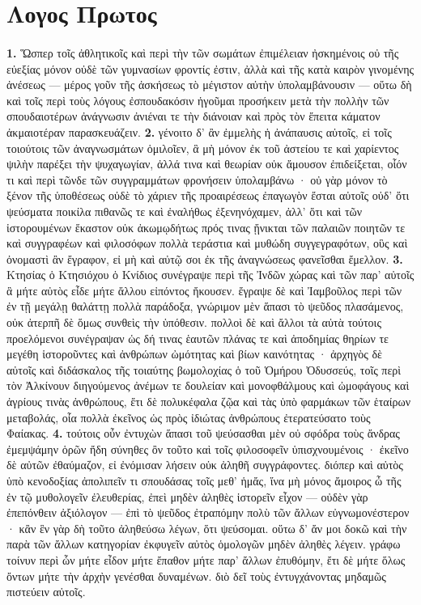 \documentclass[a4paper, 11pt, oneside, polutonikogreek, german]{article}
\begin{document}
\section{Λογος Πρωτος}
\paragraph{}
\textbf{1.} Ὥσπερ τοῖς ἀθλητικοῖς καὶ περὶ τὴν τῶν σωμάτων ἐπιμέλειαν ἠσκημένοις οὐ τῆς εὐεξίας μόνον οὐδὲ τῶν γυμνασίων φροντίς ἐστιν, ἀλλὰ καὶ τῆς κατὰ καιρὸν γινομένης ἀνέσεως --- μέρος γοῦν τῆς ἀσκήσεως τὸ μέγιστον αὐτὴν ὑπολαμβάνουσιν --- οὕτω δὴ καὶ τοῖς περὶ τοὺς λόγους ἐσπουδακόσιν ἡγοῦμαι προσήκειν μετὰ τὴν πολλὴν τῶν σπουδαιοτέρων ἀνάγνωσιν ἀνιέναι τε τὴν διάνοιαν καὶ πρὸς τὸν ἔπειτα κάματον ἀκμαιοτέραν παρασκευάζειν. \textbf{2.} γένοιτο δ' ἂν ἐμμελὴς ἡ ἀνάπαυσις αὐτοῖς, εἰ τοῖς τοιούτοις τῶν ἀναγνωσμάτων ὁμιλοῖεν, ἃ μὴ μόνον ἐκ τοῦ ἀστείου τε καὶ χαρίεντος ψιλὴν παρέξει τὴν ψυχαγωγίαν, ἀλλά τινα καὶ θεωρίαν οὐκ ἄμουσον ἐπιδείξεται, οἷόν τι καὶ περὶ τῶνδε τῶν συγγραμμάτων φρονήσειν ὑπολαμβάνω · οὐ γὰρ μόνον τὸ ξένον τῆς ὑποθέσεως οὐδὲ τὸ χάριεν τῆς προαιρέσεως ἐπαγωγὸν ἔσται αὐτοῖς οὐδ' ὅτι ψεύσματα ποικίλα πιθανῶς τε καὶ ἐναλήθως ἐξενηνόχαμεν, ἀλλ' ὅτι καὶ τῶν ἱστορουμένων ἕκαστον οὐκ ἀκωμῳδήτως πρός τινας ᾔνικται τῶν παλαιῶν ποιητῶν τε καὶ συγγραφέων καὶ φιλοσόφων πολλὰ τεράστια καὶ μυθώδη συγγεγραφότων, οὓς καὶ ὀνομαστὶ ἂν ἔγραφον, εἰ μὴ καὶ αὐτῷ σοι ἐκ τῆς ἀναγνώσεως φανεῖσθαι ἔμελλον. \textbf{3.} Κτησίας ὁ Κτησιόχου ὁ Κνίδιος συνέγραψε περὶ τῆς Ἰνδῶν χώρας καὶ τῶν παρ' αὐτοῖς ἃ μήτε αὐτὸς εἶδε μήτε ἄλλου εἰπόντος ἤκουσεν. ἔγραψε δὲ καὶ Ἰαμβοῦλος περὶ τῶν ἐν τῇ μεγάλῃ θαλάττῃ πολλὰ παράδοξα, γνώριμον μὲν ἅπασι τὸ ψεῦδος πλασάμενος, οὐκ ἀτερπῆ δὲ ὅμως συνθεὶς τὴν ὑπόθεσιν. πολλοὶ δὲ καὶ ἄλλοι τὰ αὐτὰ τούτοις προελόμενοι συνέγραψαν ὡς δή τινας ἑαυτῶν πλάνας τε καὶ ἀποδημίας θηρίων τε μεγέθη ἱστοροῦντες καὶ ἀνθρώπων ὠμότητας καὶ βίων καινότητας · ἀρχηγὸς δὲ αὐτοῖς καὶ διδάσκαλος τῆς τοιαύτης βωμολοχίας ὁ τοῦ Ὁμήρου Ὀδυσσεύς, τοῖς περὶ τὸν Ἀλκίνουν διηγούμενος ἀνέμων τε δουλείαν καὶ μονοφθάλμους καὶ ὠμοφάγους καὶ ἀγρίους τινὰς ἀνθρώπους, ἔτι δὲ πολυκέφαλα ζῷα καὶ τὰς ὑπὸ φαρμάκων τῶν ἑταίρων μεταβολάς, οἷα πολλὰ ἐκεῖνος ὡς πρὸς ἰδιώτας ἀνθρώπους ἐτερατεύσατο τοὺς Φαίακας. \textbf{4.} τούτοις οὖν ἐντυχὼν ἅπασι τοῦ ψεύσασθαι μὲν οὐ σφόδρα τοὺς ἄνδρας ἐμεμψάμην ὁρῶν ἤδη σύνηθες ὂν τοῦτο καὶ τοῖς φιλοσοφεῖν ὑπισχνουμένοις · ἐκεῖνο δὲ αὐτῶν ἐθαύμαζον, εἰ ἐνόμισαν λήσειν οὐκ ἀληθῆ συγγράφοντες. διόπερ καὶ αὐτὸς ὑπὸ κενοδοξίας ἀπολιπεῖν τι σπουδάσας τοῖς μεθ' ἡμἄς, ἵνα μὴ μόνος ἄμοιρος ὦ τῆς ἐν τῷ μυθολογεῖν ἐλευθερίας, ἐπεὶ μηδὲν ἀληθὲς ἱστορεῖν εἶχον --- οὐδὲν γὰρ ἐπεπόνθειν ἀξιόλογον --- ἐπὶ τὸ ψεῦδος ἐτραπόμην πολὺ τῶν ἄλλων εὐγνωμονέστερον · κἂν ἓν γὰρ δὴ τοῦτο ἀληθεύσω λέγων, ὅτι ψεύσομαι. οὕτω δ' ἄν μοι δοκῶ καὶ τὴν παρὰ τῶν ἄλλων κατηγορίαν ἐκφυγεῖν αὐτὸς ὁμολογῶν μηδὲν ἀληθὲς λέγειν. γράφω τοίνυν περὶ ὧν μήτε εἶδον μήτε ἔπαθον μήτε παρ' ἄλλων ἐπυθόμην, ἔτι δὲ μήτε ὅλως ὄντων μήτε τὴν ἀρχὴν γενέσθαι δυναμένων. διὸ δεῖ τοὺς ἐντυγχάνοντας μηδαμῶς πιστεύειν αὐτοῖς.
\end{document}
